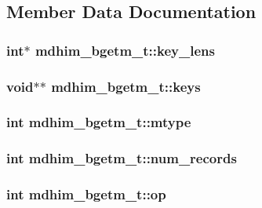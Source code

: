\subsection{Member Data Documentation}
\hypertarget{structmdhim__bgetm__t_a1bda084b30e5429093159a78827efb52}{
\subsubsection[{key\-\_\-lens}]{\setlength{\rightskip}{0pt plus 5cm}int$\ast$ mdhim\-\_\-bgetm\-\_\-t\-::key\-\_\-lens}}\label{d5/def/structmdhim__bgetm__t_a1bda084b30e5429093159a78827efb52}
\hypertarget{structmdhim__bgetm__t_a6abc6929954a3e7aab4b71f12b9db668}{
\subsubsection[{keys}]{\setlength{\rightskip}{0pt plus 5cm}void$\ast$$\ast$ mdhim\-\_\-bgetm\-\_\-t\-::keys}}\label{d5/def/structmdhim__bgetm__t_a6abc6929954a3e7aab4b71f12b9db668}
\hypertarget{structmdhim__bgetm__t_aa52b25716fcf7fdc26af4dd48056d976}{
\subsubsection[{mtype}]{\setlength{\rightskip}{0pt plus 5cm}int mdhim\-\_\-bgetm\-\_\-t\-::mtype}}\label{d5/def/structmdhim__bgetm__t_aa52b25716fcf7fdc26af4dd48056d976}
\hypertarget{structmdhim__bgetm__t_af952f7de3351ee73515c1948c5faf927}{
\subsubsection[{num\-\_\-records}]{\setlength{\rightskip}{0pt plus 5cm}int mdhim\-\_\-bgetm\-\_\-t\-::num\-\_\-records}}\label{d5/def/structmdhim__bgetm__t_af952f7de3351ee73515c1948c5faf927}
\hypertarget{structmdhim__bgetm__t_aa4e54e836da625bad6ebc439c5f9e047}{
\subsubsection[{op}]{\setlength{\rightskip}{0pt plus 5cm}int mdhim\-\_\-bgetm\-\_\-t\-::op}}\label{d5/def/structmdhim__bgetm__t_aa4e54e836da625bad6ebc439c5f9e047}
